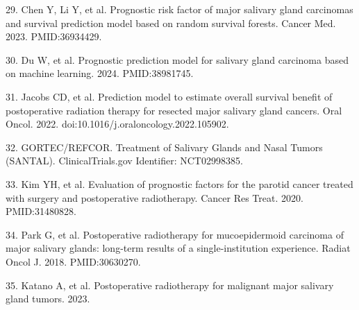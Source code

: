 \documentclass[9pt,twocolumn]{extarticle}
\begin{document}
29. Chen Y, Li Y, et al. Prognostic risk factor of major salivary gland carcinomas and survival prediction model based on random survival forests. Cancer Med. 2023. PMID:36934429.\par
30. Du W, et al. Prognostic prediction model for salivary gland carcinoma based on machine learning. 2024. PMID:38981745.\par
31. Jacobs CD, et al. Prediction model to estimate overall survival benefit of postoperative radiation therapy for resected major salivary gland cancers. Oral Oncol. 2022. doi:10.1016/j.oraloncology.2022.105902.\par
32. GORTEC/REFCOR. Treatment of Salivary Glands and Nasal Tumors (SANTAL). ClinicalTrials.gov Identifier: NCT02998385.\par
33. Kim YH, et al. Evaluation of prognostic factors for the parotid cancer treated with surgery and postoperative radiotherapy. Cancer Res Treat. 2020. PMID:31480828.\par
34. Park G, et al. Postoperative radiotherapy for mucoepidermoid carcinoma of major salivary glands: long-term results of a single-institution experience. Radiat Oncol J. 2018. PMID:30630270.\par
35. Katano A, et al. Postoperative radiotherapy for malignant major salivary gland tumors. 2023.\par
\end{document}

